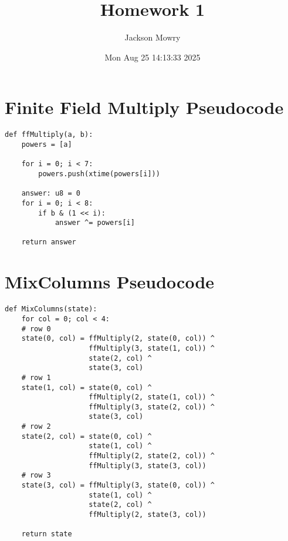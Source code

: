 \documentclass[11pt]{article}
\author{Jackson Mowry}
\date{Mon Aug 25 14:13:33 2025}
\title{Homework 1}
\begin{document}
\maketitle
\tableofcontents

\section{Finite Field Multiply Pseudocode}
\label{sec:orgbccc17f}
\begin{verbatim}
def ffMultiply(a, b):
    powers = [a]

    for i = 0; i < 7:
        powers.push(xtime(powers[i]))

    answer: u8 = 0
    for i = 0; i < 8:
        if b & (1 << i):
            answer ^= powers[i]

    return answer
\end{verbatim}
\section{MixColumns Pseudocode}
\label{sec:orged18abc}
\begin{verbatim}
def MixColumns(state):
    for col = 0; col < 4:
    # row 0
    state(0, col) = ffMultiply(2, state(0, col)) ^
                    ffMultiply(3, state(1, col)) ^
                    state(2, col) ^
                    state(3, col)
    # row 1
    state(1, col) = state(0, col) ^
                    ffMultiply(2, state(1, col)) ^
                    ffMultiply(3, state(2, col)) ^
                    state(3, col)
    # row 2
    state(2, col) = state(0, col) ^
                    state(1, col) ^
                    ffMultiply(2, state(2, col)) ^
                    ffMultiply(3, state(3, col))
    # row 3
    state(3, col) = ffMultiply(3, state(0, col)) ^
                    state(1, col) ^
                    state(2, col) ^
                    ffMultiply(2, state(3, col))

    return state
\end{verbatim}
\end{document}
